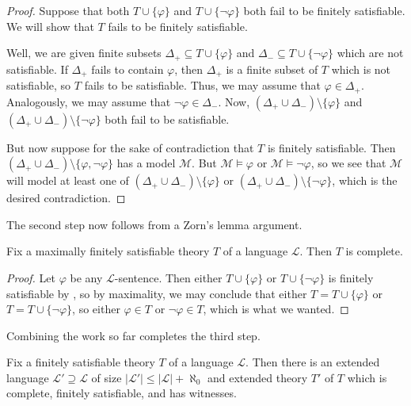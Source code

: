 \documentclass[../notes.tex]{subfiles}
\begin{document}
\begin{proof}
	Suppose that both $T\cup\{\varphi\}$ and $T\cup\{\lnot\varphi\}$ both fail to be finitely satisfiable. We will show that $T$ fails to be finitely satisfiable.

	Well, we are given finite subsets $\Delta_+\subseteq T\cup\{\varphi\}$ and $\Delta_-\subseteq T\cup\{\lnot\varphi\}$ which are not satisfiable. If $\Delta_+$ fails to contain $\varphi$, then $\Delta_+$ is a finite subset of $T$ which is not satisfiable, so $T$ fails to be satisfiable. Thus, we may assume that $\varphi\in\Delta_+$. Analogously, we may assume that $\lnot\varphi\in\Delta_-$. Now, $(\Delta_+\cup\Delta_-)\setminus\{\varphi\}$ and $(\Delta_+\cup\Delta_-)\setminus\{\lnot\varphi\}$ both fail to be satisfiable.

	But now suppose for the sake of contradiction that $T$ is finitely satisfiable. Then $(\Delta_+\cup\Delta_-)\setminus\{\varphi,\lnot\varphi\}$ has a model $\mathcal M$. But $\mathcal M\models\varphi$ or $\mathcal M\models\lnot\varphi$, so we see that $\mathcal M$ will model at least one of $(\Delta_+\cup\Delta_-)\setminus\{\varphi\}$ or $(\Delta_+\cup\Delta_-)\setminus\{\lnot\varphi\}$, which is the desired contradiction.
\end{proof}
The second step now follows from a Zorn's lemma argument.
\begin{lemma} \label{lem:maximal-fin-sat-is-complete}
	Fix a maximally finitely satisfiable theory $T$ of a language $\mathcal L$. Then $T$ is complete.
\end{lemma}
\begin{proof}
	Let $\varphi$ be any $\mathcal L$-sentence. Then either $T\cup\{\varphi\}$ or $T\cup\{\lnot\varphi\}$ is finitely satisfiable by , so by maximality, we may conclude that either $T=T\cup\{\varphi\}$ or $T=T\cup\{\lnot\varphi\}$, so either $\varphi\in T$ or $\lnot\varphi\in T$, which is what we wanted.
\end{proof}
Combining the work so far completes the third step.
\begin{lemma} \label{lem:extend-for-complete}
	Fix a finitely satisfiable theory $T$ of a language $\mathcal L$. Then there is an extended language $\mathcal L'\supseteq\mathcal L$ of size $\left|\mathcal L'\right|\le\left|\mathcal L\right|+\aleph_0$ and extended theory $T'$ of $T$ which is complete, finitely satisfiable, and has witnesses.
\end{lemma}
\end{document}
